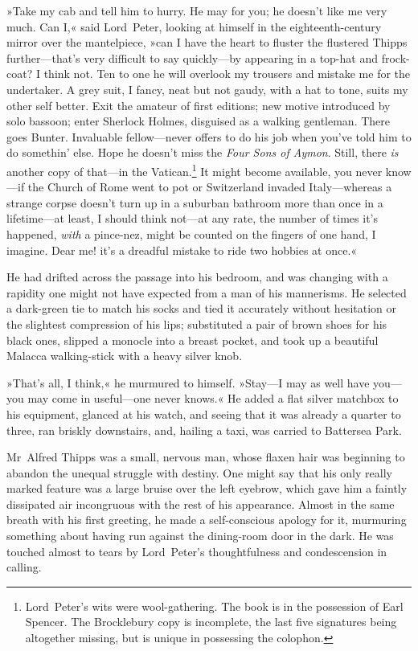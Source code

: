 »Take my cab and tell him to hurry. He may for you; he doesn't like me very much. Can I,« said Lord~Peter, looking at himself in the eighteenth-century mirror over the mantelpiece, »can I have the heart to fluster the flustered Thipps further—that's very difficult to say quickly—by appearing in a top-hat and frock-coat? I think not. Ten to one he will overlook my trousers and mistake me for the undertaker. A grey suit, I fancy, neat but not gaudy, with a hat to tone, suits my other self better. Exit the amateur of first editions; new motive introduced by solo bassoon; enter Sherlock Holmes, disguised as a walking gentleman. There goes Bunter. Invaluable fellow—never offers to do his job when you've told him to do somethin' else. Hope he doesn't miss the \textit{Four Sons of Aymon}. Still, there \textit{is} another copy of that—in the Vatican.\footnote{Lord~Peter's wits were wool-gathering. The book is in the possession of Earl Spencer. The Brocklebury copy is incomplete, the last five signatures being altogether missing, but is unique in possessing the colophon.} It might become available, you never know—if the Church of Rome went to pot or Switzerland invaded Italy—whereas a strange corpse doesn't turn up in a suburban bathroom more than once in a lifetime—at least, I should think not—at any rate, the number of times it's happened, \textit{with} a pince-nez, might be counted on the fingers of one hand, I imagine. Dear me! it's a dreadful mistake to ride two hobbies at once.«

He had drifted across the passage into his bedroom, and was changing with a rapidity one might not have expected from a man of his mannerisms. He selected a dark-green tie to match his socks and tied it accurately without hesitation or the slightest compression of his lips; substituted a pair of brown shoes for his black ones, slipped a monocle into a breast pocket, and took up a beautiful Malacca walking-stick with a heavy silver knob.

»That's all, I think,« he murmured to himself. »Stay—I may as well have you—you may come in useful—one never knows.« He added a flat silver matchbox to his equipment, glanced at his watch, and seeing that it was already a quarter to three, ran briskly downstairs, and, hailing a taxi, was carried to Battersea Park.

Mr~Alfred Thipps was a small, nervous man, whose flaxen hair was beginning to abandon the unequal struggle with destiny. One might say that his only really marked feature was a large bruise over the left eyebrow, which gave him a faintly dissipated air incongruous with the rest of his appearance. Almost in the same breath with his first greeting, he made a self-conscious apology for it, murmuring something about having run against the dining-room door in the dark. He was touched almost to tears by Lord~Peter's thoughtfulness and condescension in calling.


